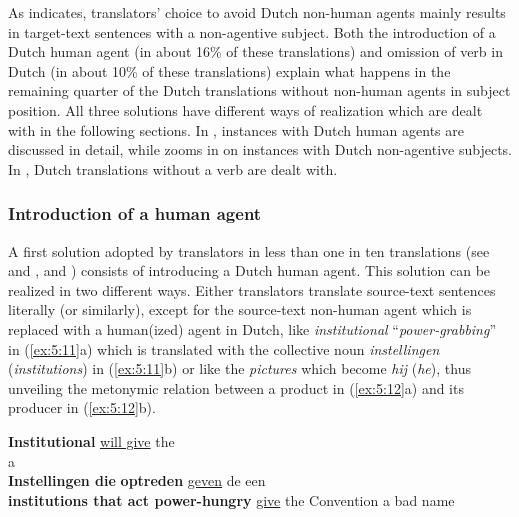 \documentclass[output=paper]{LSP/langsci}
\begin{document}
As  indicates, translators’ choice to avoid Dutch non-human agents mainly results in target-text sentences with a non-agentive subject. Both the introduction of a Dutch human agent (in about 16\% of these translations) and omission of verb in Dutch (in about 10\% of these translations) explain what happens in the remaining quarter of the Dutch translations without non-human agents in subject position. All three solutions have different ways of realization which are dealt with in the following sections. In , instances with Dutch human agents are discussed in detail, while  zooms in on instances with Dutch non-agentive subjects. In , Dutch translations without a verb are dealt with.  

\subsubsection{Introduction of a human agent} \label{sec:5:6:2:1}

A first solution adopted by translators in less than one in ten translations (see  and ,  and ) consists of introducing a Dutch human agent. This solution can be realized in two different ways. Either translators translate source-text sentences literally (or similarly), except for the source-text non-human agent which is replaced with a human(ized) agent in Dutch, like \textit{institutional} “\textit{power-grabbing}” in (\ref{ex:5:11}a) which is translated with the collective noun \textit{instellingen} (\textit{institutions}) in (\ref{ex:5:11}b) or like the \textit{pictures} which become \textit{hij} (\textit{he}), thus unveiling the metonymic relation between a product in (\ref{ex:5:12}a) and its producer in (\ref{ex:5:12}b).  

\ea \label{ex:5:11}
\ea \textbf{Institutional}  \ul{will give} the \\ a \\[1em]
\ex \textbf{Instellingen die}  \textbf{optreden} \ul{geven} de  een \\
\textbf{institutions that act power-hungry} \ul{give} the Convention a bad name
\z
\z

\end{document}
